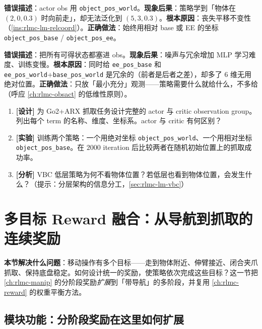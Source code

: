 \begin{pitfall}[物体位置用世界坐标而非相对坐标]
\textbf{错误描述}：actor obs 用 \verb|object_pos_world|。\textbf{现象后果}：策略学到「物体在 $(2,0,0.3)$ 时向前走」，却无法泛化到 $(5,3,0.3)$。\textbf{根本原因}：丧失平移不变性（\cref{ins:rlmc-lm-relcoord}）。\textbf{正确做法}：始终用相对 base 或 EE 的坐标 \verb|object_pos_base| / \verb|object_pos_ee|。
\end{pitfall}

\begin{pitfall}
\textbf{错误描述}：把所有可得状态都塞进 obs。\textbf{现象后果}：噪声与冗余增加 MLP 学习难度、训练变慢。\textbf{根本原因}：同时给 \verb|ee_pos_base| 和 \verb|ee_pos_world|+\verb|base_pos_world| 是冗余的（前者是后者之差），却多了 $6$ 维无用绝对位置。\textbf{正确做法}：只放「最小充分」观测——策略需要什么就给什么，不多给（呼应 \cref{ch:rlmc-obsact} 的低维性原则）。
\end{pitfall}

\begin{practice}[练习·观测融合]
\begin{enumerate}
\item \textbf{[设计]} 为 Go2+ARX 抓取任务设计完整的 actor 与 critic observation group。列出每个 term 的名称、维度、坐标系。actor 与 critic 有何区别？
\item \textbf{[实验]} 训练两个策略：一个用绝对坐标 \verb|object_pos_world|、一个用相对坐标 \verb|object_pos_base|。在 $2000$ iteration 后比较两者在随机初始位置上的抓取成功率。
\item \textbf{[分析]} VBC 低层策略为何不看物体位置？若低层也看到物体位置，会发生什么？（提示：分层架构的信息分工，\cref{sec:rlmc-lm-vbc}）
\end{enumerate}
\end{practice}

\section{多目标 Reward 融合：从导航到抓取的连续奖励}
\label{sec:rlmc-lm-reward}

\textbf{本节解决什么问题}：移动操作有多个目标——走到物体附近、伸臂接近、闭合夹爪抓取、保持底盘稳定。如何设计统一的奖励，使策略依次完成这些目标？这一节把 \cref{ch:rlmc-manip} 的分阶段奖励\emph{扩展}到「带导航」的多阶段，并复用 \cref{ch:rlmc-reward} 的权重平衡方法。

\subsection{模块功能：分阶段奖励在这里如何扩展}
\label{sec:rlmc-lm-reward-stages}

